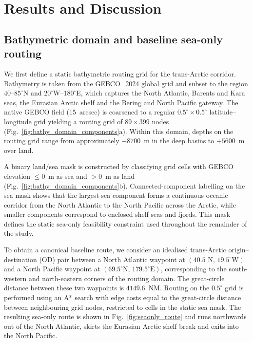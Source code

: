 \section{Results and Discussion}\label{sec:results_and_discussion}

\subsection{Bathymetric domain and baseline sea-only routing}
\label{sec:results_bathy_baseline}

We first define a static bathymetric routing grid for the trans-Arctic corridor.
Bathymetry is taken from the GEBCO\_2024 global grid and subset to the region
$40$--$85^{\circ}$N and $20^{\circ}$W–$180^{\circ}$E, which captures the North
Atlantic, Barents and Kara seas, the Eurasian Arctic shelf and the Bering and
North Pacific gateway. The native GEBCO field (15~arcsec) is coarsened to a
regular $0.5^{\circ}\times0.5^{\circ}$ latitude--longitude grid yielding a routing grid of $89\times399$ nodes
(Fig.~\ref{fig:bathy_domain_components}a). Within this domain, depths on the
routing grid range from approximately $-8700$~m in the deep basins to $+5600$~m
over land.

A binary land/sea mask is constructed by classifying grid cells with
GEBCO elevation $\leq 0$~m as sea and $>0$~m as land
(Fig.~\ref{fig:bathy_domain_components}b). Connected-component labelling on the
sea mask shows that the largest sea component forms a continuous oceanic
corridor from the North Atlantic to the North Pacific across the Arctic, while
smaller components correspond to enclosed shelf seas and fjords. This mask
defines the static sea-only feasibility constraint used throughout the
remainder of the study.

To obtain a canonical baseline route, we consider an idealised
trans-Arctic origin–destination (OD) pair between a North Atlantic waypoint at
$(40.5^{\circ}\text{N},\,19.5^{\circ}\text{W})$ and a North Pacific waypoint at
$(69.5^{\circ}\text{N},\,179.5^{\circ}\text{E})$, corresponding to the
south-western and north-eastern corners of the routing domain. The great-circle
distance between these two waypoints is $4149.6$~NM. Routing on the $0.5^{\circ}$
grid is performed using an A* search with edge costs equal to the great-circle
distance between neighbouring grid nodes, restricted to cells in the static
sea mask. The resulting sea-only route is shown in
Fig.~\ref{fig:seaonly_route} and runs northwards out of the North Atlantic,
skirts the Eurasian Arctic shelf break and exits into the North Pacific.

